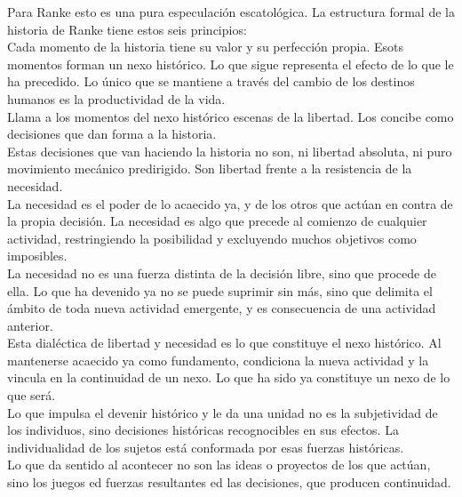 \documentclass[a4paper, 11pt, twocolumn, spanish]{article}
\begin{document}
Para Ranke esto es una pura especulación escatológica. La estructura
formal de la historia de Ranke tiene estos seis principios:\\[0pt]
Cada momento de la historia tiene su valor y su perfección
propia. Esots momentos forman un nexo histórico. Lo que sigue
representa el efecto de lo que le ha precedido. Lo único que se
mantiene a través del cambio de los destinos humanos es la
productividad de la vida.\\[0pt]
Llama a los momentos del nexo histórico escenas de la libertad. Los
concibe como decisiones que dan forma a la historia.\\[0pt]
Estas decisiones que van haciendo la historia no son, ni libertad
absoluta, ni puro movimiento mecánico predirigido. Son libertad frente
a la resistencia de la necesidad.\\[0pt]
La necesidad es el poder de lo acaecido ya, y de los otros que actúan
en contra de la propia decisión. La necesidad es algo que precede al
comienzo de cualquier actividad, restringiendo la posibilidad y
excluyendo muchos objetivos como imposibles.\\[0pt]
La necesidad no es una fuerza distinta de la decisión libre, sino que
procede de ella. Lo que ha devenido ya no se puede suprimir sin más,
sino que delimita el ámbito de toda nueva actividad emergente, y es
consecuencia de una actividad anterior.\\[0pt]
Esta dialéctica de libertad y necesidad es lo que constituye el nexo
histórico. Al mantenerse acaecido ya como fundamento, condiciona la
nueva actividad y la vincula en la continuidad de un nexo. Lo que ha
sido ya constituye un nexo de lo que será.\\[0pt]

Lo que impulsa el devenir histórico y le da una unidad no es la
subjetividad de los individuos, sino decisiones históricas
recognocibles en sus efectos. La individualidad de los sujetos está
conformada por esas fuerzas históricas.\\[0pt]
Lo que da sentido al acontecer no son las ideas o proyectos de los que
actúan, sino los juegos ed fuerzas resultantes ed las decisiones, que
producen continuidad.\\[0pt]
\end{document}
